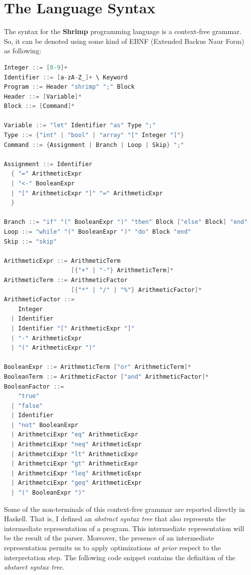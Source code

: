 \documentclass[12pt,a4paper]{article}
\begin{document}
\section*{The Language Syntax}
The syntax for the \textbf{Shrimp} programming language is a context-free grammar.
So, it can be denoted using some kind of EBNF (Extended Backus Naur Form) as following:
\begin{lstlisting}[language=C, style=custom-style]
Integer ::= [0-9]+
Identifier ::= [a-zA-Z_]+ \ Keyword
Program ::= Header "shrimp" ";" Block
Header ::= [Variable]*
Block ::= [Command]*

Variable ::= "let" Identifier "as" Type ";"
Type ::= {"int" | "bool" | "array" "[" Integer "]"}
Command ::= {Assignment | Branch | Loop | Skip} ";"

Assignment ::= Identifier
  { "=" ArithmeticExpr
  | "<-" BooleanExpr
  | "[" ArithmeticExpr "]" "=" ArithmeticExpr
  }

Branch ::= "if" "(" BooleanExpr ")" "then" Block ["else" Block] "end"
Loop ::= "while" "(" BooleanExpr ")" "do" Block "end"
Skip ::= "skip"

ArithmeticExpr ::= ArithmeticTerm
                   [{"+" | "-"} ArithmeticTerm]*
ArithmeticTerm ::= ArithmeticFactor
                   [{"*" | "/" | "%"} ArithmeticFactor]*
ArithmeticFactor ::=
    Integer
  | Identifier
  | Identifier "[" ArithmeticExpr "]"
  | "-" ArithmeticExpr
  | "(" ArithmeticExpr ")"

BooleanExpr ::= ArithmeticTerm ["or" ArithmeticTerm]*
BooleanTerm ::= ArithmeticFactor ["and" ArithmeticFactor]*
BooleanFactor ::=
    "true"
  | "false"
  | Identifier
  | "not" BooleanExpr
  | ArithmetciExpr "eq" ArithmeticExpr
  | ArithmetciExpr "neq" ArithmeticExpr
  | ArithmetciExpr "lt" ArithmeticExpr
  | ArithmetciExpr "gt" ArithmeticExpr
  | ArithmetciExpr "leq" ArithmeticExpr
  | ArithmetciExpr "geq" ArithmeticExpr
  | "(" BooleanExpr ")"
\end{lstlisting}
Some of the non-terminals of this context-free grammar are reported directly in Haskell.
That is, I defined an \textit{abstract syntax tree} that also represents the intermediate representation of a program.
This intermediate representation will be the result of the parser.
Moreover, the presence of an intermediate representation permits us to apply optimizations \textit{at prior} respect to the interpretation step.
The following code snippet contains the definition of the \textit{abstarct syntax tree}.
\end{document}
